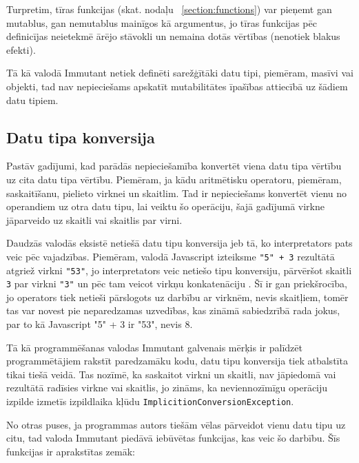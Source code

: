 \documentclass[12pt,a4paper]{report}
\begin{document}
Turpretim, tīras funkcijas (skat. nodaļu ~\ref{section:functions}) var pieņemt gan mutablus, gan nemutablus mainīgos kā argumentus, jo tīras funkcijas pēc definicījas neietekmē ārējo stāvokli un nemaina dotās vērtības (nenotiek blakus efekti).

Tā kā valodā Immutant netiek definēti sarežģītāki datu tipi, piemēram, masīvi vai objekti, tad nav nepieciešams apskatīt mutabilitātes īpašības attiecībā uz šādiem datu tipiem. 

\subsection{Datu tipa konversija}
\label{section:datatype-conversion}

Pastāv gadījumi, kad parādās nepieciešamība konvertēt viena datu tipa vērtību uz cita datu tipa vērtību. Piemēram, ja kādu aritmētisku operatoru, piemēram, saskaitīšanu, pielieto virknei un skaitlim. Tad ir nepieciešams konvertēt vienu no operandiem uz otra datu tipu, lai veiktu šo operāciju, šajā gadījumā virkne jāparveido uz skaitli vai skaitlis par virni. 

Daudzās valodās eksistē netiešā datu tipu konversija jeb tā, ko interpretators pats veic pēc vajadzības. Piemēram, valodā Javascript izteiksme \texttt{"5" + 3} rezultātā atgriež virkni \texttt{"53"}, jo interpretators veic netiešo tipu konversiju, pārvēršot skaitli \texttt{3} par virkni \texttt{"3"} un pēc tam veicot virkņu konkatenāciju \cite{ecma-262}. Šī ir gan priekšrocība, jo operators tiek netieši pārslogots uz darbību ar virknēm, nevis skaitļiem, tomēr tas var novest pie neparedzamas uzvedības, kas zināmā sabiedzrībā rada jokus, par to kā Javascript "5" + 3 ir "53", nevis 8.

Tā kā programmēšanas valodas Immutant galvenais mērķis ir palīdzēt programmētājiem rakstīt paredzamāku kodu, datu tipu konversija tiek atbalstīta tikai tiešā veidā. Tas nozīmē, ka saskaitot virkni un skaitli, nav jāpiedomā vai rezultātā radīsies virkne vai skaitlis, jo zināms, ka neviennozīmīgu operāciju izpilde izmetīs izpildlaika kļūdu \texttt{ImplicitionConversionException}.

No otras puses, ja programmas autors tiešām vēlas pārveidot vienu datu tipu uz citu, tad valoda Immutant piedāvā iebūvētas funkcijas, kas veic šo darbību. Šīs funkcijas ir aprakstītas zemāk:
\end{document}
